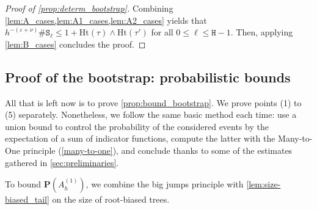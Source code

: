 \documentclass[11pt,reqno]{amsart}
\newcommand{\1}{\mathbf{1}}
\newcommand{\0}{\mathbf{0}}
\newcommand{\ttS}{\mathtt{S}}
\newcommand{\ttH}{\mathtt{H}}
\newcommand{\prob}{\mathbf{P}}
\newcommand{\Ht}{\mathrm{Ht}}
\newcommand{\eps}{\varepsilon}
\begin{document}
\begin{proof}[Proof of \cref{prop:determ_bootstrap}]
Combining \cref{lem:A_cases,lem:A1_cases,lem:A2_cases} yields that $h^{-(\eps+\nu)}\# \ttS_\ell\leq 1+\Ht(\tau)\wedge\Ht(\tau')$ for all $0\leq \ell\leq \ttH-1$. Then, applying \cref{lem:B_cases} concludes the proof.
\end{proof}


\subsection{Proof of the bootstrap: probabilistic bounds}
\label{sec:bound_bootstrap}

All that is left now is to prove \cref{prop:bound_bootstrap}. We prove points (1) to (5) separately. Nonetheless, we follow the same basic method each time: use a union bound to control the probability of the considered events by the expectation of a sum of indicator functions, compute the latter with the Many-to-One principle (\cref{many-to-one}), and conclude thanks to some of the estimates gathered in \cref{sec:preliminaries}.

To bound $\prob(A_h^{(1)})$, we combine the big jumps principle with \cref{lem:size-biased_tail} on the size of root-biased trees.
\end{document}
